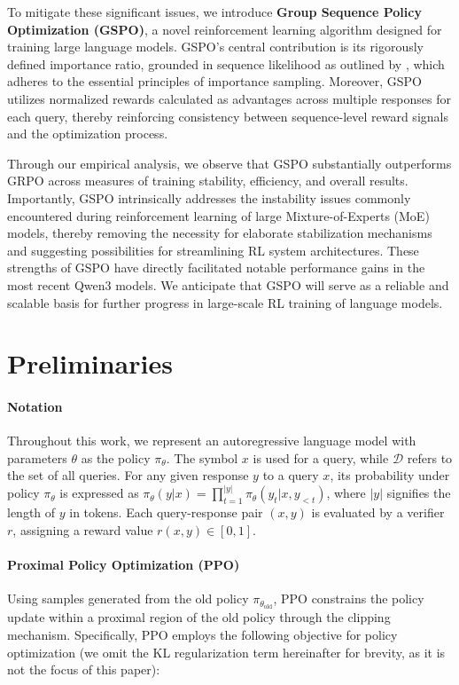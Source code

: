 To mitigate these significant issues, we introduce \textbf{Group Sequence Policy Optimization (GSPO)}, a novel reinforcement learning algorithm designed for training large language models. GSPO's central contribution is its rigorously defined importance ratio, grounded in sequence likelihood as outlined by \citep{click}, which adheres to the essential principles of importance sampling. Moreover, GSPO utilizes normalized rewards calculated as advantages across multiple responses for each query, thereby reinforcing consistency between sequence-level reward signals and the optimization process.

Through our empirical analysis, we observe that GSPO substantially outperforms GRPO across measures of training stability, efficiency, and overall results. Importantly, GSPO intrinsically addresses the instability issues commonly encountered during reinforcement learning of large Mixture-of-Experts (MoE) models, thereby removing the necessity for elaborate stabilization mechanisms and suggesting possibilities for streamlining RL system architectures. These strengths of GSPO have directly facilitated notable performance gains in the most recent Qwen3 models. We anticipate that GSPO will serve as a reliable and scalable basis for further progress in large-scale RL training of language models.

\section{Preliminaries}

\paragraph{Notation}
Throughout this work, we represent an autoregressive language model with parameters $\theta$ as the policy $\pi_\theta$. The symbol $x$ is used for a query, while $\mathcal{D}$ refers to the set of all queries. For any given response $y$ to a query $x$, its probability under policy $\pi_\theta$ is expressed as $\pi_\theta (y | x)=\prod_{t=1}^{|y|} \pi_\theta (y_t | x, y_{<t} )$, where $|y|$ signifies the length of $y$ in tokens. Each query-response pair $(x, y)$ is evaluated by a verifier $r$, assigning a reward value $r(x, y) \in [ 0, 1 ]$.

\paragraph{Proximal Policy Optimization (PPO)} Using samples generated from the old policy $\pi_{\theta_\text{old}}$, PPO \citep{ppo} constrains the policy update within a proximal region of the old policy through the clipping mechanism. Specifically, PPO employs the following objective for policy optimization (we omit the KL regularization term hereinafter for brevity, as it is not the focus of this paper):


